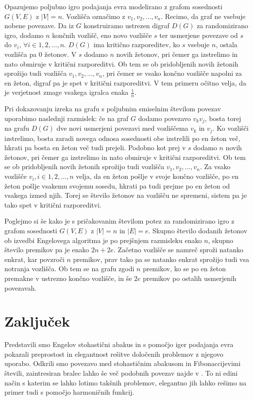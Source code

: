 \documentclass[twoside,11pt]{article}
\begin{document}
\begin{dokaz}
   Opazujemo poljubno igro podajanja evra modelirano z grafom sosednosti $G(V,E)$ z $|V|=n$. Vozlišča označimo z $v_1,v_2,\ldots,v_n$. 
   Recimo, da graf ne vsebuje nobene povezave.
   Da iz $G$ konstruiramo ustrezen digraf $D(G)$ za randomizirano igro, dodamo $n$ končnih vozlišč, eno novo vozlišče $s$ ter usmerjene povezave od $s$ do $v_i$, $ \forall i\in {1,2,\ldots,n}$.
   $D(G)$ ima kritično razporeditev, ko $s$ vsebuje $n$, ostala vozlišča pa $0$ žetonov. V $s$ dodamo $n$ novih žetonov, pri čemer ga izstrelimo in nato obmiruje v kritični razporeditvi.
   Ob tem se ob pridobljenih novih žetonih sprožijo tudi vozlišča $v_1,v_2,\ldots,v_n$, pri čemer se vsako končno vozlišče napolni za en žeton, digraf pa je spet v kritični razporeditvi.
   V tem primeru očitno velja, da je verjetnost zmage vsakega igralca enaka $\frac{1}{n}$.

   Pri dokazovanju izreka na grafu s poljubnim smiselnim številom povezav uporabimo naslednji razmislek: če na graf $G$ dodamo povezavo $v_kv_j$, bosta torej na grafu $D(G)$ dve novi usmerjeni povezavi med vozliščema $v_k$ in $v_j$.
   Ko vozlišči izstrelimo, bosta zaradi novega odnosa sosednosti obe izstrelili po en žeton več, hkrati pa bosta en žeton več tudi prejeli. Podobno kot prej v $s$ dodamo $n$ novih žetonov, pri čemer ga izstrelimo in nato obmiruje v kritični razporeditvi.
   Ob tem se ob pridobljenih novih žetonih sprožijo tudi vozlišča $v_1,v_2,\ldots,v_n$. Za vsako vozlišče $v_i, i\in{1,2,\ldots,n}$ velja, da en žeton pošlje v svoje končno vozlišče, po en žeton pošlje vsakemu svojemu sosedu, hkrati pa tudi prejme po en žeton od vsakega izmed njih.
   Torej se število žetonov na vozlišču ne spremeni, sistem pa je tako spet v kritični razporeditvi.
   \hfill \QED

\end{dokaz}

Poglejmo si še kako je s pričakovanim številom potez za randomizirano igro z grafom sosednosti $G(V,E)$ z $|V|=n$ in $|E|=e$. Skupno število dodanih žetonov ob izvedbi Engelovega algoritma 
je po prejšnjem razmisleku enako $n$, skupno število premikov pa je enako $2n+2e$. Začetno vozlišče se namreč sproži natanko enkrat, kar povzroči $n$ premikov, 
prav tako pa se natanko enkrat sprožijo tudi vsa notranja vozlišča. 
Ob tem se na grafu zgodi $n$ premikov, ko se po en žeton premakne v ustrezno končno vozlišče, in še $2e$ premikov po ostalih usmerjenih povezavah. 

\section{Zaključek}
Predstavili smo Engelov stohastični abakus in s pomočjo iger podajanja evra pokazali preprostost in elegantnost rešitve določenih problemov z njegovo uporabo. 
Odkrili smo povezavo med stohastičnim abakusom in Fibonaccijevimi števili, zaintresiran bralec lahko še več podobnih povezav najde v \cite{7}. To ni edini način s katerim se lahko lotimo takšnih problemov, elegantno jih lahko rešimo na primer tudi s pomočjo harmoničnih funkcij.
\end{document}
